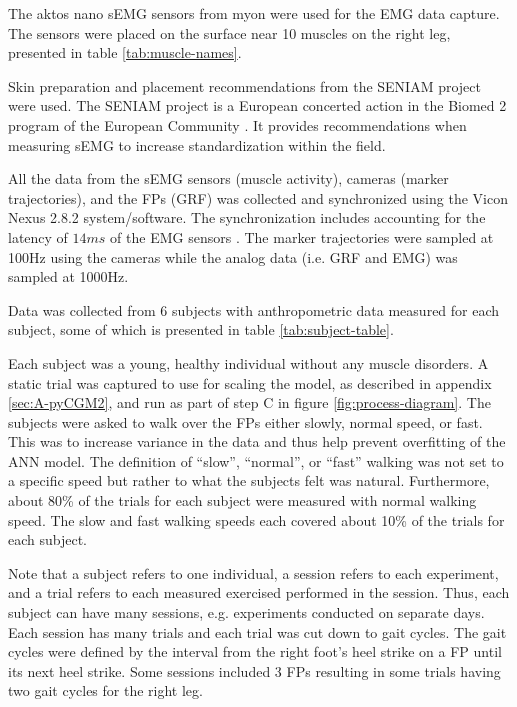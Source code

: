 \documentclass[../main.tex]{subfiles}
\begin{document}
The aktos nano \ac{sEMG} sensors from myon were used for the \ac{EMG} data capture. 
The sensors were placed on the surface near 10 muscles on the right leg, presented in table \ref{tab:muscle-names}. 

Skin preparation and placement recommendations from the SENIAM project \cite{Stegeman2007, Hermens1999, Hermens2000} were used. The SENIAM project is a European concerted action in the Biomed 2 program of the European Community \cite{Stegeman2007}. It provides recommendations when measuring \ac{sEMG} to increase standardization within the field.

All the data from the \ac{sEMG} sensors (muscle activity), cameras (marker trajectories), and the \acp{FP} (\ac{GRF}) was collected and synchronized using the Vicon Nexus 2.8.2 system/software.
The synchronization includes accounting for the latency of $14ms$ of the \ac{EMG} sensors \cite{aktosEMG}.
The marker trajectories were sampled at 100Hz using the cameras while the analog data (i.e. \ac{GRF} and \ac{EMG}) was sampled at 1000Hz.

Data was collected from 6 subjects with anthropometric data measured for each subject, some of which is presented in table \ref{tab:subject-table}.

Each subject was a young, healthy individual without any muscle disorders.
A static trial was captured to use for scaling the model, as described in appendix \ref{sec:A-pyCGM2}, and run as part of step C in figure \ref{fig:process-diagram}.
The subjects were asked to walk over the \acp{FP} either slowly, normal speed, or fast.
This was to increase variance in the data and thus help prevent overfitting of the \ac{ANN} model.
The definition of ``slow'', ``normal'', or ``fast'' walking was not set to a specific speed but rather to what the subjects felt was natural.
Furthermore, about 80\% of the trials for each subject were measured with normal walking speed.
The slow and fast walking speeds each covered about 10\% of the trials for each subject.

Note that a subject refers to one individual, a session refers to each experiment, and a trial refers to each measured exercised performed in the session. 
Thus, each subject can have many sessions, e.g. experiments conducted on separate days.
Each session has many trials and each trial was cut down to gait cycles. 
The gait cycles were defined by the interval from the right foot's heel strike on a \ac{FP} until its next heel strike.
Some sessions included 3 \acp{FP} resulting in some trials having two gait cycles for the right leg.
\end{document}
